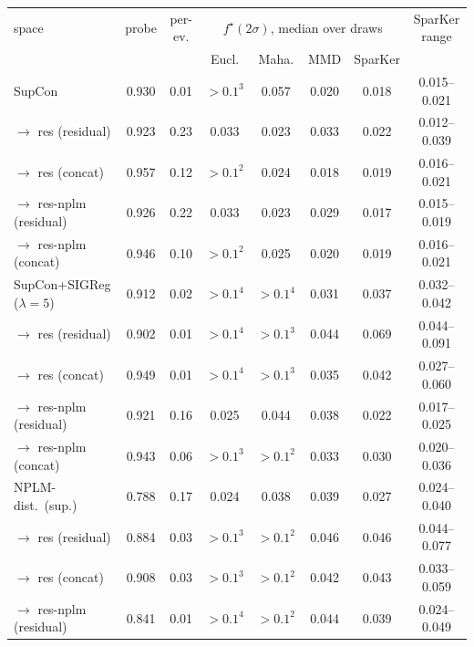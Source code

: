 \begin{table}[t]
\centering
\small
\begin{tabular}{lcccccc c}
\toprule
space & probe & per-ev. & \multicolumn{4}{c}{$f^\star(2\sigma)$, median over draws} & SparKer range \\
\cmidrule(lr){4-7}
& & & Eucl. & Maha. & MMD & SparKer & \\
\midrule
SupCon & 0.930 & 0.01 & $>0.1^{3}$ & 0.057 & 0.020 & 0.018 & 0.015--0.021 \\
\quad $\to$ res (residual) & 0.923 & 0.23 & 0.033 & 0.023 & 0.033 & 0.022 & 0.012--0.039 \\
\quad $\to$ res (concat) & 0.957 & 0.12 & $>0.1^{2}$ & 0.024 & 0.018 & 0.019 & 0.016--0.021 \\
\quad $\to$ res-nplm (residual) & 0.926 & 0.22 & 0.033 & 0.023 & 0.029 & 0.017 & 0.015--0.019 \\
\quad $\to$ res-nplm (concat) & 0.946 & 0.10 & $>0.1^{2}$ & 0.025 & 0.020 & 0.019 & 0.016--0.021 \\
\addlinespace
SupCon+SIGReg ($\lambda{=}5$) & 0.912 & 0.02 & $>0.1^{4}$ & $>0.1^{4}$ & 0.031 & 0.037 & 0.032--0.042 \\
\quad $\to$ res (residual) & 0.902 & 0.01 & $>0.1^{4}$ & $>0.1^{3}$ & 0.044 & 0.069 & 0.044--0.091 \\
\quad $\to$ res (concat) & 0.949 & 0.01 & $>0.1^{4}$ & $>0.1^{3}$ & 0.035 & 0.042 & 0.027--0.060 \\
\quad $\to$ res-nplm (residual) & 0.921 & 0.16 & 0.025 & 0.044 & 0.038 & 0.022 & 0.017--0.025 \\
\quad $\to$ res-nplm (concat) & 0.943 & 0.06 & $>0.1^{3}$ & $>0.1^{2}$ & 0.033 & 0.030 & 0.020--0.036 \\
\addlinespace
NPLM-dist.\ (sup.) & 0.788 & 0.17 & 0.024 & 0.038 & 0.039 & 0.027 & 0.024--0.040 \\
\quad $\to$ res (residual) & 0.884 & 0.03 & $>0.1^{3}$ & $>0.1^{2}$ & 0.046 & 0.046 & 0.044--0.077 \\
\quad $\to$ res (concat) & 0.908 & 0.03 & $>0.1^{3}$ & $>0.1^{2}$ & 0.042 & 0.043 & 0.033--0.059 \\
\quad $\to$ res-nplm (residual) & 0.841 & 0.01 & $>0.1^{4}$ & $>0.1^{2}$ & 0.044 & 0.039 & 0.024--0.049 \\

\end{tabular}
\end{table}
